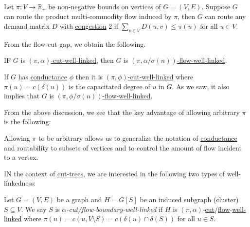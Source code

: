 \begin{claim}
	Let \(\pi \colon V \to \mathbb{R} _+\) be non-negative bounds on vertices of \(G = (V, E)\). Suppose \(G\) can route the product multi-commodity flow induced by \(\pi \), then \(G\) can route any demand matrix \(D\) with \hyperref[def:congestion]{congestion} \(2\) if \(\sum_{v \in V} D(u, v) \leq \pi (u)\) for all \(u \in V\).
\end{claim}

From the flow-cut gap, we obtain the following.

\begin{claim}
	IF \(G\) is \hyperref[def:cut-well-linked]{\((\pi , \alpha )\)-cut-well-linked}, then \(G\) is \hyperref[def:flow-well-linked]{\((\pi , \alpha / \sigma (n))\)-flow-well-linked}.
\end{claim}

\begin{note}
	If \(G\) has \hyperref[def:conductance]{conductance} \(\phi \) then it is \hyperref[def:cut-well-linked]{\((\pi , \phi )\)-cut-well-linked} where \(\pi (u) = c(\delta (u))\) is the capacitated degree of \(u\) in \(G\). As we saw, it also implies that \(G\) is \hyperref[def:flow-well-linked]{\((\pi , \phi / \sigma (n))\)-flow-well-linked}.
\end{note}

From the above discussion, we see that the key advantage of allowing arbitrary \(\pi \) is the following:

\begin{intuition}
	Allowing \(\pi \) to be arbitrary allows us to generalize the notation of \hyperref[def:conductance]{conductance} and routability to subsets of vertices and to control the amount of flow incident to a vertex.
\end{intuition}

IN the context of \hyperref[def:cut-tree]{cut-trees}, we are interested in the following two types of well-linkedness:

\begin{definition}\label{def:boundary-well-linked}
	Let \(G = (V, E)\) be a graph and \(H = G[S]\) be an induced subgraph (cluster) \(S \subseteq V\). We say \(S\) is \emph{\(\alpha \)-cut/flow-boundary-well-linked} if \(H\) is \((\pi , \alpha )\)-\hyperref[def:cut-well-linked]{cut}/\hyperref[def:flow-well-linked]{flow}-\hyperref[def:cut-flow-well-linked]{well-linked} where \(\pi (u) = c(u, V\setminus S) = c(\delta (u) \cap \delta (S))\) for all \(u \in S\).
\end{definition}

